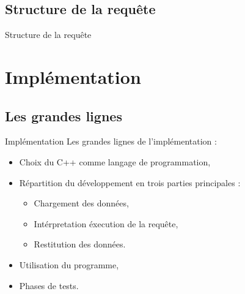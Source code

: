 \documentclass[10pt,handout]{beamer}
\newif\ifplacelogo %
\begin{document}
\subsection{Structure de la requête}

\placelogofalse
\begin{frame}{Structure de la requête}
\end{frame}
\placelogotrue



\section{Implémentation}

\subsection{Les grandes lignes}

\begin{frame}{Implémentation}
  Les grandes lignes de l'implémentation :
  \begin{itemize}
    \item Choix du C++ comme langage de programmation,
    \item Répartition du développement en trois parties principales :
    \begin{itemize}
      \item Chargement des données,
      \item Intérpretation éxecution de la requête,
      \item Restitution des données.
    \end{itemize}
    \item Utilisation du programme,
    \item Phases de tests.
  \end{itemize}
\end{frame}
\end{document}
